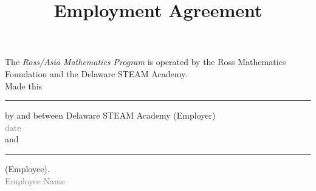 \documentclass{rossasia}
\title{Employment Agreement}
\begin{document}
\maketitle

The {\it Ross/Asia Mathematics Program} is operated by the Ross Mathematics Foundation and the Delaware STEAM Academy.\\



Made this \rule{2cm}{.1mm} by and between Delaware STEAM Academy (Employer)  \\[-5pt]  
	 \hspace*{23mm} \textcolor{gray}{\scriptsize date}\\[4pt]
and \rule{8cm}{.1mm} (Employee).\\[-5pt]
	 \hspace*{27mm} \textcolor{gray}{\scriptsize Employee Name}\\

\end{document}
